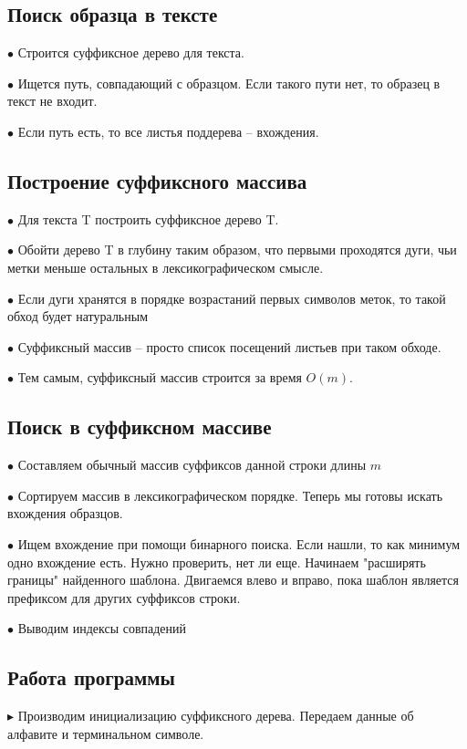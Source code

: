 \subsection*{Поиск образца в тексте}
$\bullet$ Строится суффиксное дерево для текста.

$\bullet$ Ищется путь,
совпадающий с образцом.
Если такого пути нет, то
образец в текст не входит.

$\bullet$ Если путь есть, то все
листья поддерева --
вхождения.

\subsection*{Построение суффиксного массива} 

$\bullet$ Для текста T построить суффиксное дерево T.

$\bullet$ Обойти дерево T в глубину таким образом, что первыми
проходятся дуги, чьи метки меньше остальных в
лексикографическом смысле.

$\bullet$ Если дуги хранятся в порядке возрастаний первых
символов меток, то такой обход будет натуральным

$\bullet$ Суффиксный массив -- просто список посещений листьев
при таком обходе.

$\bullet$ Тем самым, суффиксный массив строится за время $O(m)$.

\subsection*{Поиск в суффиксном массиве} 

$\bullet$ Составляем обычный массив суффиксов данной строки длины $m$

$\bullet$ Сортируем массив в лексикографическом порядке. Теперь мы готовы искать вхождения образцов.

$\bullet$ Ищем вхождение при помощи бинарного поиска. Если нашли, то как минимум одно
вхождение есть. Нужно проверить, нет ли еще. Начинаем "расширять границы" найденного шаблона. Двигаемся влево и вправо, пока шаблон является префиксом для других суффиксов строки.

$\bullet$ Выводим индексы совпадений

\subsection*{Работа программы}

$\blacktriangleright$ Производим инициализацию суффиксного дерева. Передаем данные об алфавите и терминальном символе.

